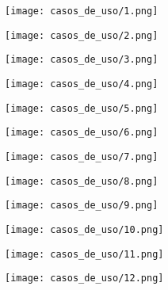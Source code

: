 \documentclass[12pt, spanish]{article}
\begin{document}
\begin{centering}\texttt{[image: casos\_de\_uso/1.png]}\\[1.0 cm]\end{centering}
\pagebreak
\begin{centering}\texttt{[image: casos\_de\_uso/2.png]}\\[1.0 cm]\end{centering}
\pagebreak
\begin{centering}\texttt{[image: casos\_de\_uso/3.png]}\\[1.0 cm]\end{centering}
\pagebreak
\begin{centering}\texttt{[image: casos\_de\_uso/4.png]}\\[1.0 cm]\end{centering}
\pagebreak
\begin{centering}\texttt{[image: casos\_de\_uso/5.png]}\\[1.0 cm]\end{centering}
\pagebreak
\begin{centering}\texttt{[image: casos\_de\_uso/6.png]}\\[1.0 cm]\end{centering}
\pagebreak
\begin{centering}\texttt{[image: casos\_de\_uso/7.png]}\\[1.0 cm]\end{centering}
\pagebreak
\begin{centering}\texttt{[image: casos\_de\_uso/8.png]}\\[1.0 cm]\end{centering}
\pagebreak
\begin{centering}\texttt{[image: casos\_de\_uso/9.png]}\\[1.0 cm]\end{centering}
\pagebreak
\begin{centering}\texttt{[image: casos\_de\_uso/10.png]}\\[1.0 cm]\end{centering}
\pagebreak
\begin{centering}\texttt{[image: casos\_de\_uso/11.png]}\\[1.0 cm]\end{centering}
\pagebreak
\begin{centering}\texttt{[image: casos\_de\_uso/12.png]}\\[1.0 cm]\end{centering}
\end{document}
